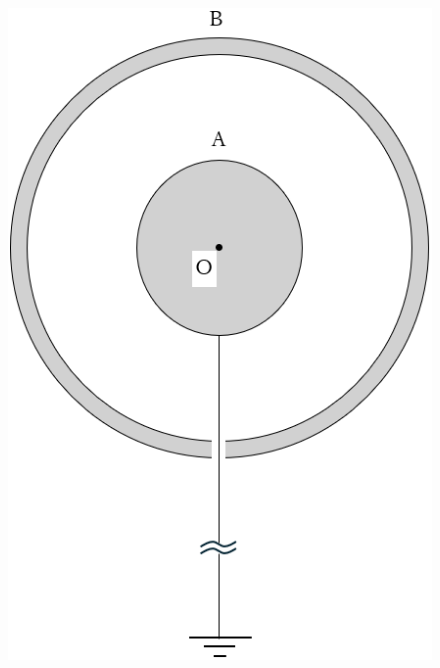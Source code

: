 \begin{figure}[H]
\begin{minipage}{.3\columnwidth}
    \includegraphics[width=\columnwidth]{../graphs/open_19_8_2-3.png}
    \caption{} 
  \end{minipage}
\end{figure}



